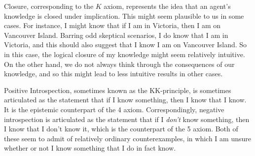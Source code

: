 \documentclass[../../../include/open-logic-section]{subfiles}
\begin{document}
Closure, corresponding to the $K$ axiom, represents the idea that an
agent's knowledge is closed under implication. This might seem
plausible to us in some cases. For instance, I might know that if I am
in Victoria, then I am on Vancouver Island. Barring odd skeptical
scenarios, I do know that I am in Victoria, and this should also
suggest that I know I am on Vancouver Island. So in this case, the
logical closure of my knowledge might seem relatively intuitive. On
the other hand, we do not always think through the consequences of our
knowledge, and so this might lead to less intuitive results in other
cases.

Positive Introspection, sometimes known as the KK-principle, is
sometimes articulated as the statement that if I know something, then
I know that I know. It is the epistemic counterpart of the 4 axiom.
Correspondingly, negative introspection is articulated as the
statement that if I \emph{don't} know something, then I know that I
don't know it, which is the counterpart of the 5 axiom. Both of these
seem to admit of relatively ordinary counterexamples, in which I am
unsure whether or not I know something that I do in fact know. 
\end{document}
